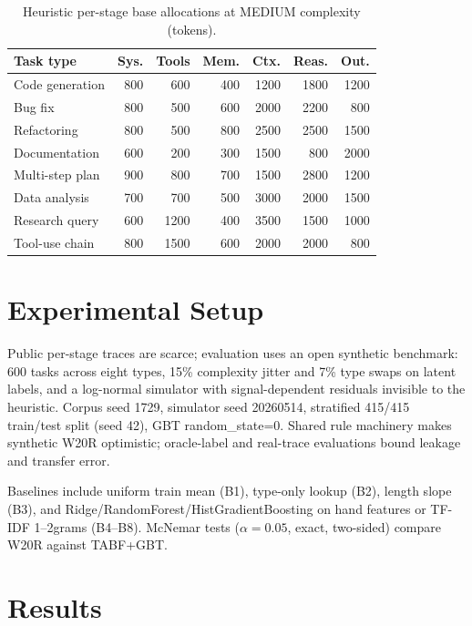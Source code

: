 \documentclass[journal]{IEEEtran}
\newcommand{\code}[1]{{\small #1}}
\begin{document}
\begin{table}[!t]
\caption{Heuristic per-stage base allocations at MEDIUM complexity (tokens).}
\label{tab:base}
\centering
\footnotesize
\begin{tabular}{lrrrrrr}
\toprule
Task type & Sys. & Tools & Mem. & Ctx. & Reas. & Out. \\
\midrule
Code generation & 800 & 600 & 400 & 1200 & 1800 & 1200 \\
Bug fix & 800 & 500 & 600 & 2000 & 2200 & 800 \\
Refactoring & 800 & 500 & 800 & 2500 & 2500 & 1500 \\
Documentation & 600 & 200 & 300 & 1500 & 800 & 2000 \\
Multi-step plan & 900 & 800 & 700 & 1500 & 2800 & 1200 \\
Data analysis & 700 & 700 & 500 & 3000 & 2000 & 1500 \\
Research query & 600 & 1200 & 400 & 3500 & 1500 & 1000 \\
Tool-use chain & 800 & 1500 & 600 & 2000 & 2000 & 800 \\
\bottomrule
\end{tabular}
\end{table}

\section{Experimental Setup}
\label{sec:setup}

Public per-stage traces are scarce; evaluation uses an open synthetic benchmark:
600 tasks across eight types, 15\% complexity jitter and 7\% type swaps on latent
labels, and a log-normal simulator with signal-dependent residuals invisible to
the heuristic. Corpus seed 1729, simulator seed 20260514, stratified 415/415
train/test split (seed 42), GBT \code{random\_state=0}. Shared rule machinery
makes synthetic W20R optimistic; oracle-label and real-trace evaluations bound
leakage and transfer error.

Baselines include uniform train mean (B1), type-only lookup (B2), length slope
(B3), and Ridge/RandomForest/HistGradientBoosting on hand features or TF-IDF
1--2grams (B4--B8). McNemar tests ($\alpha=0.05$, exact, two-sided) compare
W20R against TABF+GBT.

\section{Results}
\label{sec:results}
\end{document}
